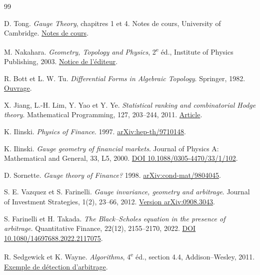 \documentclass[11pt,a4paper]{article}
\theoremstyle{clair}
\begin{document}
\clearpage
\begin{thebibliography}{99}
\small
\setlength{\itemsep}{3pt}
\label{sec:references}
D. Tong. \emph{Gauge Theory}, chapitres 1 et 4.
Notes de cours, University of Cambridge.
\href{https://www.damtp.cam.ac.uk/user/tong/gaugetheory.html}{Notes de cours}.

M. Nakahara. \emph{Geometry, Topology and Physics}, 2\textsuperscript{e} éd.,
Institute of Physics Publishing, 2003.
\href{https://www.routledge.com/Geometry-Topology-and-Physics-2nd-Edition/Nakahara/p/book/9780750306065}{Notice de l'éditeur}.

R. Bott et L. W. Tu. \emph{Differential Forms in Algebraic Topology}.
Springer, 1982.
\href{https://doi.org/10.1007/978-1-4757-3951-0}{Ouvrage}.

X. Jiang, L.-H. Lim, Y. Yao et Y. Ye. \emph{Statistical ranking and combinatorial Hodge theory}.
Mathematical Programming, 127, 203--244, 2011.
\href{https://doi.org/10.1007/s10107-010-0419-x}{Article}.

K. Ilinski. \emph{Physics of Finance}. 1997.
\href{https://arxiv.org/abs/hep-th/9710148}{arXiv:hep-th/9710148}.

K. Ilinski. \emph{Gauge geometry of financial markets}.
Journal of Physics A: Mathematical and General, 33, L5, 2000.
\href{https://doi.org/10.1088/0305-4470/33/1/102}{DOI 10.1088/0305-4470/33/1/102}.

D. Sornette. \emph{Gauge theory of Finance?} 1998.
\href{https://arxiv.org/abs/cond-mat/9804045}{arXiv:cond-mat/9804045}.

S. E. Vazquez et S. Farinelli. \emph{Gauge invariance, geometry and arbitrage}.
Journal of Investment Strategies, 1(2), 23--66, 2012.
\href{https://arxiv.org/abs/0908.3043}{Version arXiv:0908.3043}.

S. Farinelli et H. Takada. \emph{The Black--Scholes equation in the presence of arbitrage}.
Quantitative Finance, 22(12), 2155--2170, 2022.
\href{https://doi.org/10.1080/14697688.2022.2117075}{DOI 10.1080/14697688.2022.2117075}.

R. Sedgewick et K. Wayne. \emph{Algorithms}, 4\textsuperscript{e} éd., section 4.4,
Addison--Wesley, 2011.
\href{https://algs4.cs.princeton.edu/44sp/Arbitrage.java.html}{Exemple de détection d'arbitrage}.


\end{thebibliography}
\end{document}
